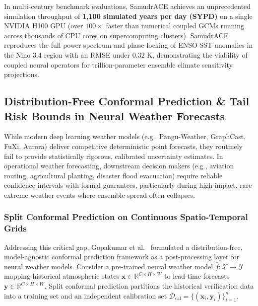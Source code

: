 In multi-century benchmark evaluations, SamudrACE achieves an unprecedented simulation throughput of \textbf{1,100 simulated years per day (SYPD)} on a single NVIDIA H100 GPU (over $100\times$ faster than numerical coupled GCMs running across thousands of CPU cores on supercomputing clusters). SamudrACE reproduces the full power spectrum and phase-locking of ENSO SST anomalies in the Nino 3.4 region with an RMSE under $0.32\text{ K}$, demonstrating the viability of coupled neural operators for trillion-parameter ensemble climate sensitivity projections.

\subsection{Distribution-Free Conformal Prediction \& Tail Risk Bounds in Neural Weather Forecasts}
\label{sec:conformal_prediction_weather}
While modern deep learning weather models (e.g., Pangu-Weather, GraphCast, FuXi, Aurora) deliver competitive deterministic point forecasts, they routinely fail to provide statistically rigorous, calibrated uncertainty estimates. In operational weather forecasting, downstream decision makers (e.g., aviation routing, agricultural planting, disaster flood evacuation) require reliable confidence intervals with formal guarantees, particularly during high-impact, rare extreme weather events where ensemble spread often collapses.

\subsubsection{Split Conformal Prediction on Continuous Spatio-Temporal Grids}
Addressing this critical gap, Gopakumar et al.~\cite{gopakumar2024conformal} formulated a distribution-free, model-agnostic conformal prediction framework as a post-processing layer for neural weather models. Consider a pre-trained neural weather model $\hat{f}: \mathcal{X} \to \mathcal{Y}$ mapping historical atmospheric states $\mathbf{x} \in \mathbb{R}^{C \times H \times W}$ to lead-time forecasts $\mathbf{y} \in \mathbb{R}^{C \times H \times W}$. Split conformal prediction partitions the historical verification data into a training set and an independent calibration set $\mathcal{D}_{\text{cal}} = \{(\mathbf{x}_i, \mathbf{y}_i)\}_{i=1}^n$.

